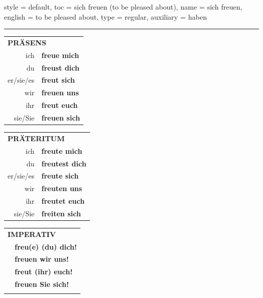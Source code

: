 \begin{verbentry}{
  style = {default},
  toc = {sich freuen (to be pleased about)},
  name = {sich freuen},
  english = {to be pleased about},
  type = {regular},
  auxiliary = {haben}
}
 
    
     \vspace{5pt}

    \hrule
    
    \vspace{5pt}

  \begin{tabular}{rl}
     \multicolumn{2}{l}{\textbf{PRÄSENS} }\\
    ich & \textbf{freue mich}\\
    du & \textbf{freust dich}\\
    er/sie/es & \textbf{freut sich}\\
    wir & \textbf{freuen uns}\\
    ihr & \textbf{freut euch}\\
    sie/Sie & \textbf{freuen sich}\\
  \end{tabular}
  \hfill
     \begin{tabular}{rl}
    \multicolumn{2}{l}{\textbf{PRÄTERITUM} }\\
    ich & \textbf{freute mich}\\
    du & \textbf{freutest dich}\\
    er/sie/es & \textbf{freute sich}\\
    wir & \textbf{freuten uns}\\
    ihr & \textbf{freutet euch}\\
    sie/Sie & \textbf{freiten sich}\\
  \end{tabular}
  \hfill
  \begin{tabular}{rl}
     \multicolumn{2}{l}{\textbf{IMPERATIV} }\\
   & \textbf{freu(e) (du) dich!}\\
   & \textbf{freuen wir uns!}\\
   & \textbf{freut (ihr) euch!}\\
   & \textbf{freuen Sie sich!}\\
   & \vspace{10pt}
  \end{tabular}

    \vspace{10pt}


\end{verbentry}
